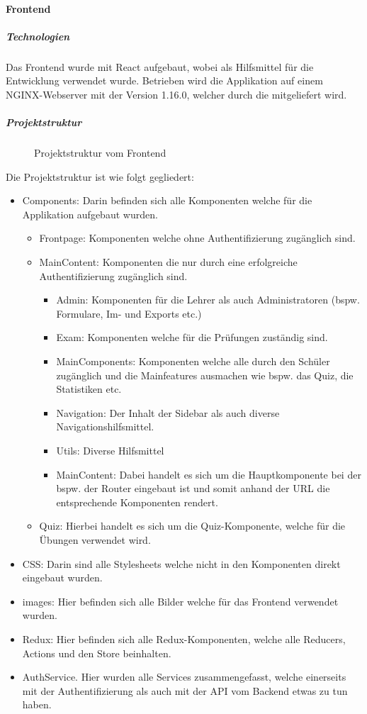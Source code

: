 \paragraph{Frontend}
\subparagraph{Technologien}
Das Frontend wurde mit React aufgebaut, wobei als Hilfsmittel \cite{create-react-app} für die Entwicklung verwendet wurde.
Betrieben wird die Applikation auf einem NGINX-Webserver mit der Version 1.16.0, welcher durch die \cite{create-react-app} mitgeliefert wird.
\subparagraph{Projektstruktur}
\begin{figure}
    \caption{Projektstruktur vom Frontend}\label{img: reactprojectstructure}
\end{figure}
Die Projektstruktur ist wie folgt gegliedert:
\begin{itemize}
    \item Components: Darin befinden sich alle Komponenten welche für die Applikation aufgebaut wurden.
    \begin{itemize}
        \item Frontpage: Komponenten welche ohne Authentifizierung zugänglich sind.
        \item MainContent: Komponenten die nur durch eine erfolgreiche Authentifizierung zugänglich sind.
        \begin{itemize}
            \item Admin: Komponenten für die Lehrer als auch Administratoren (bspw. Formulare, Im- und Exports etc.)
            \item Exam: Komponenten welche für die Prüfungen zuständig sind.
            \item MainComponents: Komponenten welche alle durch den Schüler zugänglich und die Mainfeatures ausmachen wie bspw. das Quiz, die Statistiken etc.
            \item Navigation: Der Inhalt der Sidebar als auch diverse Navigationshilfsmittel.
            \item Utils: Diverse Hilfsmittel
            \item MainContent: Dabei handelt es sich um die Hauptkomponente bei der bspw. der Router eingebaut ist und somit anhand der URL die entsprechende Komponenten rendert.
        \end{itemize}
        \item Quiz: Hierbei handelt es sich um die Quiz-Komponente, welche für die Übungen verwendet wird.
    \end{itemize}
    \item CSS: Darin sind alle Stylesheets welche nicht in den Komponenten direkt eingebaut wurden.
    \item images: Hier befinden sich alle Bilder welche für das Frontend verwendet wurden.
    \item Redux: Hier befinden sich alle Redux-Komponenten, welche alle Reducers, Actions und den Store beinhalten.
    \item AuthService. Hier wurden alle Services zusammengefasst, welche einerseits mit der Authentifizierung als auch mit der API vom Backend etwas zu tun haben.
\end{itemize}
